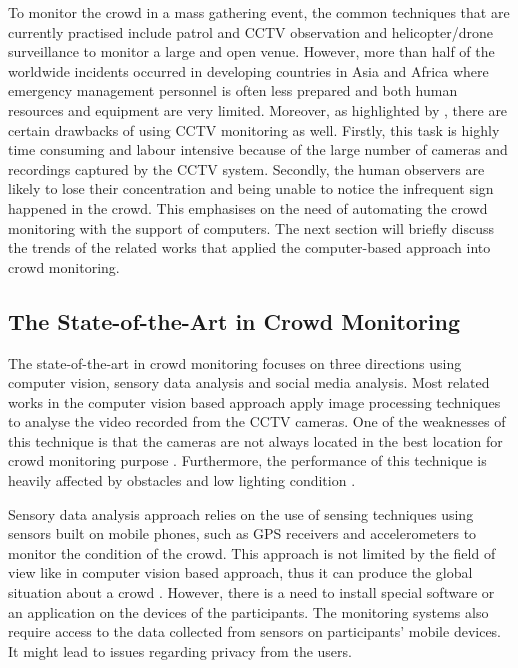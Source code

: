 To monitor the crowd in a mass gathering event, the common techniques that are currently practised include patrol and CCTV observation and helicopter/drone surveillance to monitor a large and open venue. However, more than half of the worldwide incidents occurred in developing countries in Asia and Africa \citep{BurkleJr2011} where emergency management personnel is often less prepared and both human resources and equipment are very limited. Moreover, as highlighted by \citet{Davies1995}, there are certain drawbacks of using CCTV monitoring as well. Firstly, this task is highly time consuming and labour intensive because of the large number of cameras and recordings captured by the CCTV system. Secondly, the human observers are likely to lose their concentration and being unable to notice the infrequent sign happened in the crowd. This emphasises on the need of automating the crowd monitoring with the support of computers. The next section will briefly discuss the trends of the related works that applied the computer-based approach into crowd monitoring.

\subsection{The State-of-the-Art in Crowd Monitoring}
The state-of-the-art in crowd monitoring focuses on three directions using computer vision, sensory data analysis and social media analysis. Most related works in the computer vision based approach apply image processing techniques to analyse the video recorded from the CCTV cameras. One of the weaknesses of this technique is that the cameras are not always located in the best location for crowd monitoring purpose \citep{Davies1995}. Furthermore, the performance of this technique is heavily affected by obstacles and low lighting condition \citep{Wirz2012}.

Sensory data analysis approach relies on the use of sensing techniques using sensors built on mobile phones, such as GPS receivers \citep{Wirz2012} and accelerometers \citep{Roggen2011} to monitor the condition of the crowd. This approach is not limited by the field of view like in computer vision based approach, thus it can produce the global situation about a crowd \citep{Wirz2012}. However, there is a need to install special software or an application on the devices of the participants. The monitoring systems also require access to the data collected from sensors on participants' mobile devices. It might lead to issues regarding privacy from the users.

